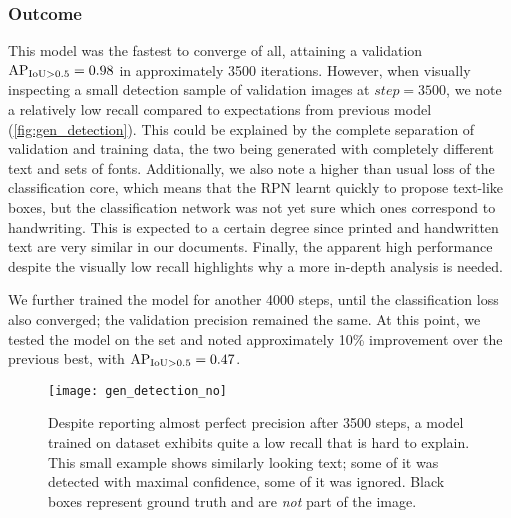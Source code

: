 		\subsubsection*{Outcome}

			This model was the fastest to converge of all, attaining a validation \(\operatorname{\operatorname{AP}_{\operatorname{IoU} > 0.5}} = 0.98\) in approximately 3500 iterations. However, when visually inspecting a small detection sample of validation images at \(\mathit{step} = 3500\), we note a relatively low recall compared to expectations from previous model (\autoref{fig:gen_detection}). This could be explained by the complete separation of validation and training data, the two being generated with completely different text and sets of fonts. Additionally, we also note a higher than usual loss of the classification core, which means that the RPN learnt quickly to propose text-like boxes, but the classification network was not yet sure which ones correspond to handwriting. This is expected to a certain degree since printed and handwritten text are very similar in our documents. Finally, the apparent high performance despite the visually low recall highlights why a more in-depth analysis is needed.

			We further trained the model for another 4000 steps, until the classification loss also converged; the validation precision remained the same. At this point, we tested the model on the  set and noted approximately 10\% improvement over the previous best, with \(\operatorname{\operatorname{AP}_{\operatorname{IoU} > 0.5}} = 0.47\).

			\begin{figure}
				{
					\caption[ detection]{Despite reporting almost perfect precision after 3500 steps, a \FRCNN{} model trained on  dataset exhibits quite a low recall that is hard to explain. This small example shows similarly looking text; some of it was detected with maximal confidence, some of it was ignored. Black boxes represent ground truth and are \emph{not} part of the image. }
					\label{fig:gen_detection}
				}
				{\texttt{[image: gen\_detection\_no]}}
			\end{figure}

